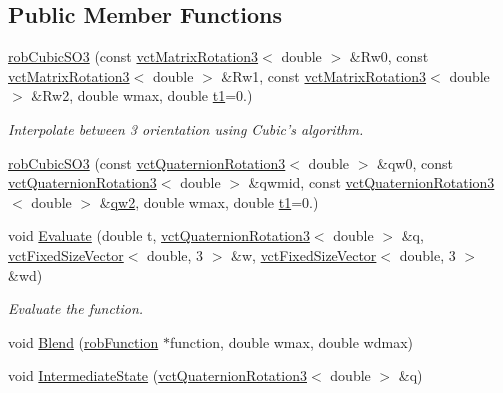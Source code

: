 \subsection*{Public Member Functions}
\begin{DoxyCompactItemize}
\item 
\hyperlink{classrob_cubic_s_o3_aab3d72bf7bebf11c4840820b972382ea}{rob\-Cubic\-S\-O3} (const \hyperlink{classvct_matrix_rotation3}{vct\-Matrix\-Rotation3}$<$ double $>$ \&Rw0, const \hyperlink{classvct_matrix_rotation3}{vct\-Matrix\-Rotation3}$<$ double $>$ \&Rw1, const \hyperlink{classvct_matrix_rotation3}{vct\-Matrix\-Rotation3}$<$ double $>$ \&Rw2, double wmax, double \hyperlink{classrob_function_a9a4b408a3a5a8ae927caec3b6bac36ef}{t1}=0.)
\begin{DoxyCompactList}\small\item\em Interpolate between 3 orientation using Cubic's algorithm. \end{DoxyCompactList}\item 
\hyperlink{classrob_cubic_s_o3_a3e972a72fb39186a29d5e0acb39be2e5}{rob\-Cubic\-S\-O3} (const \hyperlink{classvct_quaternion_rotation3}{vct\-Quaternion\-Rotation3}$<$ double $>$ \&qw0, const \hyperlink{classvct_quaternion_rotation3}{vct\-Quaternion\-Rotation3}$<$ double $>$ \&qwmid, const \hyperlink{classvct_quaternion_rotation3}{vct\-Quaternion\-Rotation3}$<$ double $>$ \&\hyperlink{classrob_function_s_o3_ae8f7673ef36c4dcf8af771af852b974d}{qw2}, double wmax, double \hyperlink{classrob_function_a9a4b408a3a5a8ae927caec3b6bac36ef}{t1}=0.)
\item 
void \hyperlink{classrob_cubic_s_o3_a75610e9d7a275e76782a7202d82c5142}{Evaluate} (double t, \hyperlink{classvct_quaternion_rotation3}{vct\-Quaternion\-Rotation3}$<$ double $>$ \&q, \hyperlink{classvct_fixed_size_vector}{vct\-Fixed\-Size\-Vector}$<$ double, 3 $>$ \&w, \hyperlink{classvct_fixed_size_vector}{vct\-Fixed\-Size\-Vector}$<$ double, 3 $>$ \&wd)
\begin{DoxyCompactList}\small\item\em Evaluate the function. \end{DoxyCompactList}\item 
void \hyperlink{classrob_cubic_s_o3_a2848a0e589ac6d9f098d0ec40835177b}{Blend} (\hyperlink{classrob_function}{rob\-Function} $\ast$function, double wmax, double wdmax)
\item 
void \hyperlink{classrob_cubic_s_o3_accc4251725d4adde202a252b5f841d0f}{Intermediate\-State} (\hyperlink{classvct_quaternion_rotation3}{vct\-Quaternion\-Rotation3}$<$ double $>$ \&q)
\end{DoxyCompactItemize}
